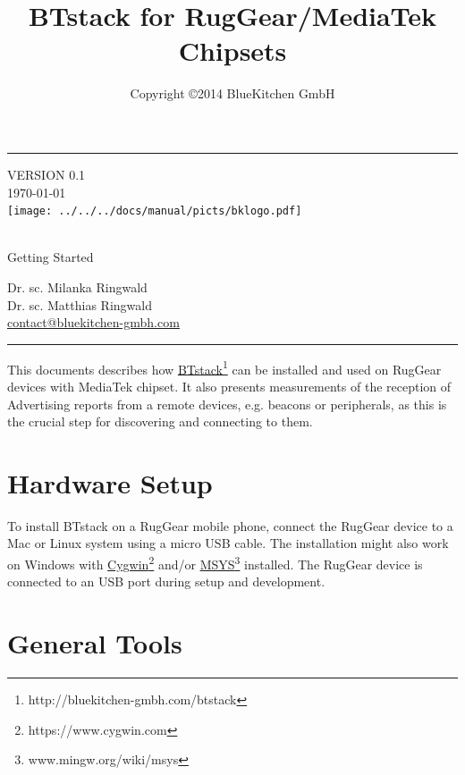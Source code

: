 \documentclass[a4paper,titlepage,oneside,12pt]{amsart} %
\title[] {BTstack for RugGear/MediaTek Chipsets}
\author{Copyright \copyright  2014 BlueKitchen GmbH}
\makeatletter
\newcommand{\versionNr}{0.1}
\newcommand{\authorMila}{Dr. sc. Milanka Ringwald}
\newcommand{\authorMatthias}{Dr. sc. Matthias Ringwald}
\newcommand{\bkContact}{\href{contact@bluekitchen-gmbh.com}{contact@bluekitchen-gmbh.com}}
\newcommand{\barWidth}{0.3cm}
\renewcommand{\maketitle}{
  \begin{titlepage}
    \fosfamily
    \begin{center}
    \begin{minipage}[b]{\textwidth}
        \begin{minipage}[b]{.1\textwidth}
            \color{bkblue}\rule{\barWidth{}}{22cm}
        \end{minipage}
        \hfill\begin{minipage}[b]{.8\textwidth}\begin{flushright}
            {\color{bkblue}VERSION \versionNr{} \\
            \today \\}
            \vspace*{7.5cm}
            \hfill\texttt{[image: ../../../docs/manual/picts/bklogo.pdf]}
            \vspace*{1.5cm}
            \begin{spacing}{2} 
                {\huge \color{bkblue} \@title} \\ 
                {\Large \color{bklightblue} Getting Started}   
            \end{spacing} 
            \vspace*{1.5cm}
            {\color{bkblue}\large \authorMila \\
            \large \authorMatthias \\
            \large \bkContact\\ }
        \end{flushright}\end{minipage}
        \vfill
        \begin{minipage}[b]{\textwidth}
            \color{bklightblue}\rule{\barWidth{}}{\barWidth{}}
        \end{minipage}
    \end{minipage}

    
    \end{center}
  \end{titlepage}
}
\makeatother
\begin{document}
\maketitle

\tableofcontents
\pagebreak

\newcommand{\urlfoot}[2]{\href{#1}{{\color{blue} #2}}\footnote{#1}}
\newcommand{\BTstack}{\urlfoot{http://bluekitchen-gmbh.com/btstack}{BTstack}{}}
\newcommand{\CydiaImpactor}{\urlfoot{http://www.cydiaimpactor.com}{Cydia Impactor}{}}
\newcommand{\CydiaImpactorURL}{\href{http://www.cydiaimpactor.com}{\color{blue} Cydia Impactor}}

\newcommand{\ADT}{\urlfoot{http://developer.android.com/tools/index.html}{Android Developer Tools}{}}
\newcommand{\nio}{\urlfoot{https://www.bluenio.com/products/accessories/niotag}{nio Tag}{}}
\newcommand{\PacketLogger}{\urlfoot{http://adcdownload.apple.com/Developer\_Tools/hardware\_io\_tools\_for\_xcode\_\_june\_2014/hardwareiotools\_june\_2014.dmg}{PacketLogger}{}}
\newcommand{\Wireshark}{\urlfoot{http://www.wireshark.org}{Wireshark}{}}
\newcommand{\Cygwin}{\urlfoot{https://www.cygwin.com}{Cygwin}{}}
\newcommand{\MSYS}{\urlfoot{www.mingw.org/wiki/msys}{MSYS}{}}
\newcommand{\adb}{\urlfoot{http://developer.android.com/tools/help/adb.html}{Android Debug Bridge}{}}

This documents describes how \BTstack{} can be installed and used on RugGear devices with MediaTek chipset. It also presents measurements of the reception of Advertising reports from a remote devices, e.g. beacons or peripherals, as this is the crucial step for discovering and connecting to them.

\section{Hardware Setup} 
To install BTstack on a RugGear mobile phone, connect the RugGear device to a Mac or Linux system using a micro USB cable. The installation might also work on Windows with \Cygwin{} and/or \MSYS{} installed. The RugGear device is connected to an USB port during setup and development.

\section{General Tools}
\end{document}
